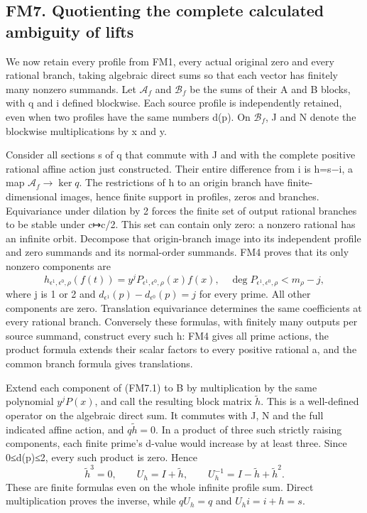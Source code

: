 \subsection{FM7. Quotienting the complete calculated ambiguity of
lifts}\label{fm7.-quotienting-the-complete-calculated-ambiguity-of-lifts}

We now retain every profile from FM1, every actual original zero and
every rational branch, taking algebraic direct sums so that each vector
has finitely many nonzero summands. Let \(\mathscr A_f\) and
\(\mathscr B_f\) be the sums of their A and B blocks, with q and i
defined blockwise. Each source profile is independently retained, even
when two profiles have the same numbers d(p). On \(\mathscr B_f\), J and
N denote the blockwise multiplications by x and y.

Consider all sections s of q that commute with J and with the complete
positive rational affine action just constructed. Their entire
difference from i is h=s−i, a map \(\mathscr A_f\to\ker q\). The
restrictions of h to an origin branch have finite-dimensional images,
hence finite support in profiles, zeros and branches. Equivariance under
dilation by 2 forces the finite set of output rational branches to be
stable under c↦c/2. This set can contain only zero: a nonzero rational
has an infinite orbit. Decompose that origin-branch image into its
independent profile and zero summands and its normal-order summands. FM4
proves that its only nonzero components are \[
h_{\epsilon^1,\epsilon^0,\rho}(f(t))
=y^j P_{\epsilon^1,\epsilon^0,\rho}(x) f(x),
\quad\deg P_{\epsilon^1,\epsilon^0,\rho}<m_\rho-j,
\tag{FM7.1}
\] where j is 1 or 2 and \(d_{\epsilon^1}(p)-d_{\epsilon^0}(p)=j\) for
every prime. All other components are zero. Translation equivariance
determines the same coefficients at every rational branch. Conversely
these formulas, with finitely many outputs per source summand, construct
every such h: FM4 gives all prime actions, the product formula extends
their scalar factors to every positive rational a, and the common branch
formula gives translations.

Extend each component of (FM7.1) to B by multiplication by the same
polynomial \(y^jP(x)\), and call the resulting block matrix
\(\widetilde h\). This is a well-defined operator on the algebraic
direct sum. It commutes with J, N and the full indicated affine action,
and \(q\widetilde h=0\). In a product of three such strictly raising
components, each finite prime's d-value would increase by at least
three. Since 0≤d(p)≤2, every such product is zero. Hence \[
\widetilde h^3=0,\qquad
U_h=I+\widetilde h,
\qquad U_h^{-1}=I-\widetilde h+\widetilde h^2.
\tag{FM7.2}
\] These are finite formulas even on the whole infinite profile sum.
Direct multiplication proves the inverse, while \(qU_h=q\) and
\(U_hi=i+h=s\).

